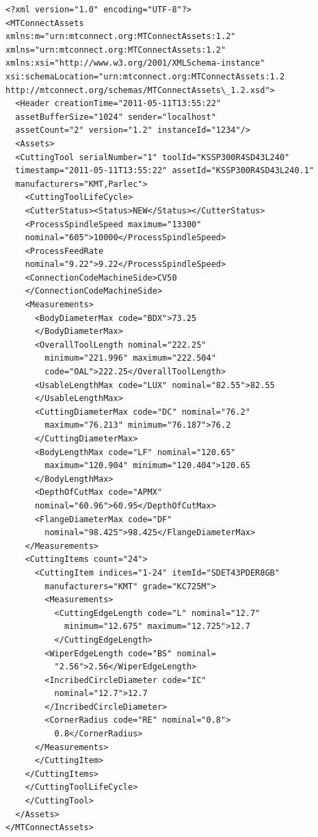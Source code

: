 \begin{lstlisting}[firstnumber=1,escapechar=|,% 
caption={Example for Indexable Insert Measurements}, label={lst:indexable-insert-measurements}]
<?xml version="1.0" encoding="UTF-8"?>
<MTConnectAssets 
xmlns:m="urn:mtconnect.org:MTConnectAssets:1.2" 
xmlns="urn:mtconnect.org:MTConnectAssets:1.2" 
xmlns:xsi="http://www.w3.org/2001/XMLSchema-instance" 
xsi:schemaLocation="urn:mtconnect.org:MTConnectAssets:1.2
http://mtconnect.org/schemas/MTConnectAssets\_1.2.xsd">
  <Header creationTime="2011-05-11T13:55:22" 
  assetBufferSize="1024" sender="localhost"
  assetCount="2" version="1.2" instanceId="1234"/>
  <Assets>
  <CuttingTool serialNumber="1" toolId="KSSP300R4SD43L240" 
  timestamp="2011-05-11T13:55:22" assetId="KSSP300R4SD43L240.1" 
  manufacturers="KMT,Parlec">
    <CuttingToolLifeCycle>
    <CutterStatus><Status>NEW</Status></CutterStatus>
    <ProcessSpindleSpeed maximum="13300" 
    nominal="605">10000</ProcessSpindleSpeed>
    <ProcessFeedRate
    nominal="9.22">9.22</ProcessSpindleSpeed>
    <ConnectionCodeMachineSide>CV50
    </ConnectionCodeMachineSide>
    <Measurements>
      <BodyDiameterMax code="BDX">73.25
      </BodyDiameterMax>
      <OverallToolLength nominal="222.25" 
        minimum="221.996" maximum="222.504" 
        code="OAL">222.25</OverallToolLength>
      <UsableLengthMax code="LUX" nominal="82.55">82.55
      </UsableLengthMax>
      <CuttingDiameterMax code="DC" nominal="76.2" 
        maximum="76.213" minimum="76.187">76.2
      </CuttingDiameterMax>
      <BodyLengthMax code="LF" nominal="120.65" 
        maximum="120.904" minimum="120.404">120.65
      </BodyLengthMax>
      <DepthOfCutMax code="APMX" 
      nominal="60.96">60.95</DepthOfCutMax>
      <FlangeDiameterMax code="DF" 
        nominal="98.425">98.425</FlangeDiameterMax>
    </Measurements>
    <CuttingItems count="24">
      <CuttingItem indices="1-24" itemId="SDET43PDER8GB" 
        manufacturers="KMT" grade="KC725M">
        <Measurements>
          <CuttingEdgeLength code="L" nominal="12.7" 
            minimum="12.675" maximum="12.725">12.7
          </CuttingEdgeLength>
        <WiperEdgeLength code="BS" nominal=
          "2.56">2.56</WiperEdgeLength>
        <IncribedCircleDiameter code="IC"
          nominal="12.7">12.7
        </IncribedCircleDiameter>
        <CornerRadius code="RE" nominal="0.8">
          0.8</CornerRadius>
      </Measurements>
      </CuttingItem>
    </CuttingItems>
    </CuttingToolLifeCycle>
    </CuttingTool>
  </Assets>
</MTConnectAssets>
\end{lstlisting}


